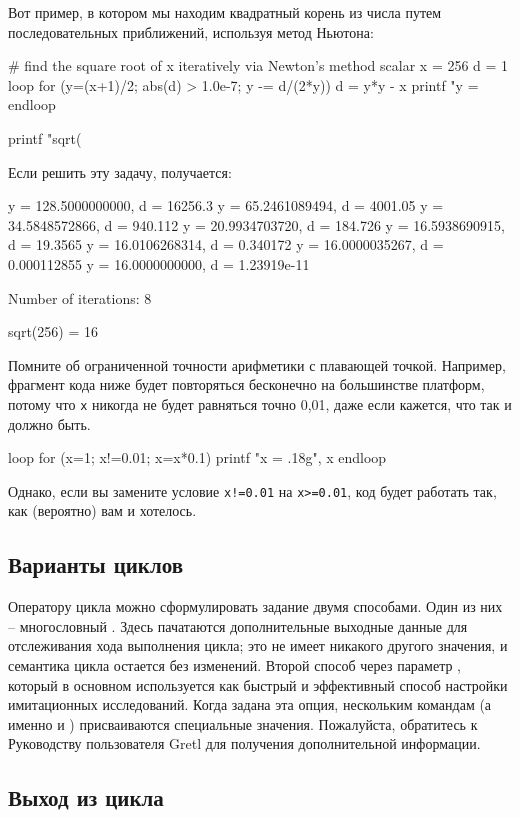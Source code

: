 Вот пример, в котором мы находим квадратный корень из числа путем
последовательных приближений, используя метод Ньютона:
\begin{code}
# find the square root of x iteratively via Newton's method
scalar x = 256
d = 1
loop for (y=(x+1)/2; abs(d) > 1.0e-7; y -= d/(2*y))
    d = y*y - x
    printf "y = %
endloop

printf "sqrt(%
\end{code}
Если решить эту задачу, получается:
\begin{code}
y =  128.5000000000, d = 16256.3
y =   65.2461089494, d = 4001.05
y =   34.5848572866, d = 940.112
y =   20.9934703720, d = 184.726
y =   16.5938690915, d = 19.3565
y =   16.0106268314, d = 0.340172
y =   16.0000035267, d = 0.000112855
y =   16.0000000000, d = 1.23919e-11

Number of iterations: 8

sqrt(256) = 16
\end{code}
Помните об ограниченной точности арифметики с плавающей
точкой. Например, фрагмент кода ниже будет повторяться бесконечно на
большинстве платформ, потому что \texttt{x} никогда не будет равняться
точно 0,01, даже если кажется, что так и должно быть.
\begin{code}
loop for (x=1; x!=0.01; x=x*0.1)
    printf "x = .18g\n", x
endloop  
\end{code}
Однако, если вы замените условие \texttt{x!=0.01} на \texttt{x>=0.01},
код будет работать так, как (вероятно) вам и хотелось.
 
\subsection{Варианты циклов}

Оператору цикла можно сформулировать задание двумя способами. Один из
них – многословный . Здесь пачатаются дополнительные
выходные данные для отслеживания хода выполнения цикла; это не имеет
никакого другого значения, и семантика цикла остается без изменений.
Второй способ через параметр , который в основном
используется как быстрый и эффективный способ настройки имитационных
исследований. Когда задана эта опция, нескольким командам (а именно
 и ) присваиваются специальные
значения. Пожалуйста, обратитесь к Руководству пользователя Gretl для
получения дополнительной информации.
 
\subsection{Выход из цикла}
\label{sec:loop-break}

